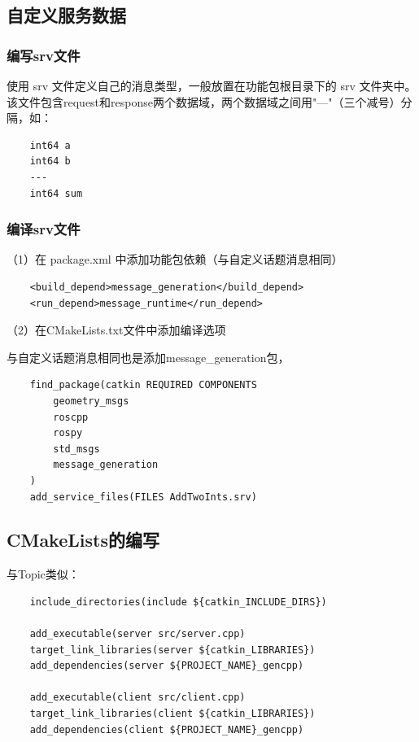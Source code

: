 \documentclass[9pt, oneside]{book}
\begin{document}
\subsection{自定义服务数据}

\subsubsection{编写srv文件}

使用 srv 文件定义自己的消息类型，一般放置在功能包根目录下的 srv 文件夹中。该文件包含request和response两个数据域，两个数据域之间用"---"（三个减号）分隔，如：

\begin{verbatim}
    int64 a
    int64 b
    ---
    int64 sum
\end{verbatim}

\subsubsection{编译srv文件}

（1）在 package.xml 中添加功能包依赖（与自定义话题消息相同）

\begin{verbatim}
    <build_depend>message_generation</build_depend>
    <run_depend>message_runtime</run_depend>
\end{verbatim}

（2）在CMakeLists.txt文件中添加编译选项

与自定义话题消息相同也是添加message\_generation包，

\begin{verbatim}
    find_package(catkin REQUIRED COMPONENTS
        geometry_msgs
        roscpp
        rospy
        std_msgs
        message_generation
    )
    add_service_files(FILES AddTwoInts.srv)
\end{verbatim}

\subsection{CMakeLists的编写}

与Topic类似：

\begin{verbatim}
    include_directories(include ${catkin_INCLUDE_DIRS})
            
    add_executable(server src/server.cpp)
    target_link_libraries(server ${catkin_LIBRARIES})
    add_dependencies(server ${PROJECT_NAME}_gencpp)

    add_executable(client src/client.cpp)
    target_link_libraries(client ${catkin_LIBRARIES})
    add_dependencies(client ${PROJECT_NAME}_gencpp)
\end{verbatim}
\end{document}
